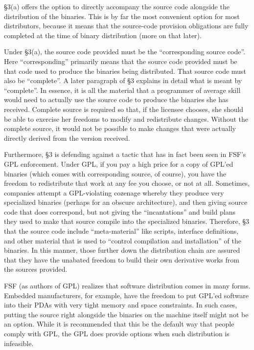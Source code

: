 \documentclass[12pt]{report}
\begin{document}
\S 3(a) offers the option to directly accompany the source code alongside
the distribution of the binaries.  This is by far the most convenient
option for most distributors, because it means that the source-code
provision obligations are fully completed at the time of binary
distribution (more on that later).

Under \S 3(a), the source code provided must be the ``corresponding source
code''.  Here ``corresponding'' primarily means that the source code
provided must be that code used to produce the binaries being distributed.
That source code must also be ``complete''.  A later paragraph of \S 3
explains in detail what is meant by ``complete''.  In essence, it is all
the material that a programmer of average skill would need to actually use
the source code to produce the binaries she has received.  Complete source
is required so that, if the licensee chooses, she should be able to
exercise her freedoms to modify and redistribute changes.  Without the
complete source, it would not be possible to make changes that were
actually directly derived from the version received.

Furthermore, \S 3 is defending against a tactic that has in fact been seen
in FSF's GPL enforcement.  Under GPL, if you pay a high price for a copy
of GPL'ed binaries (which comes with corresponding source, of course), you
have the freedom to redistribute that work at any fee you choose, or not
at all.  Sometimes, companies attempt a GPL-violating cozenage whereby
they produce very specialized binaries (perhaps for an obscure
architecture), and then giving source code that does correspond, but not
giving the ``incantations'' and build plans they used to make that source
compile into the specialized binaries.  Therefore, \S 3 that the source
code include ``meta-material'' like scripts, interface definitions, and
other material that is used to ``control compilation and installation'' of
the binaries.  In this manner, those further down the distribution chain
are assured that they have the unabated freedom to build their own
derivative works from the sources provided.

FSF (as authors of GPL) realizes that software distribution comes in many
forms.  Embedded manufacturers, for example, have the freedom to put
GPL'ed software into their PDAs with very tight memory and space
constraints.  In such cases, putting the source right alongside the
binaries on the machine itself might not be an option.  While it is
recommended that this be the default way that people comply with GPL, the
GPL does provide options when such distribution is infeasible.
\end{document}
